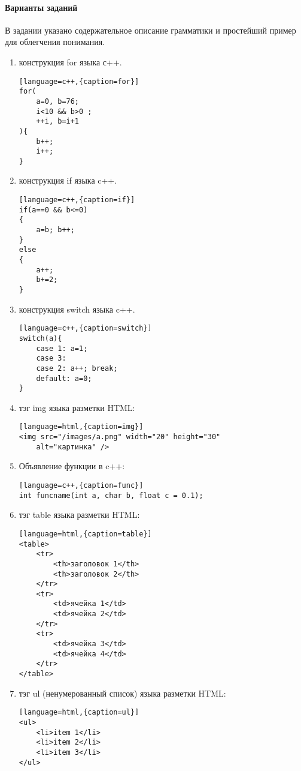 \documentclass[a4paper,12pt]{article}
\begin{document}
\paragraph{Варианты заданий}
В задании указано содержательное описание грамматики и простейший пример для облегчения понимания.
\begin{enumerate}
	\item конструкция for языка с++. 
\begin{lstlisting}[language=c++,{caption=for}]
for(
	a=0, b=76; 
	i<10 && b>0 ;
	++i, b=i+1
){ 
	b++;
	i++;
}
\end{lstlisting}

	\item конструкция if языка c++. 
\begin{lstlisting}[language=c++,{caption=if}]
if(a==0 && b<=0)
{
	a=b; b++;
}
else
{
	a++; 
	b+=2;
}
\end{lstlisting}

	\item конструкция switch языка c++. 
\begin{lstlisting}[language=c++,{caption=switch}]
switch(a){ 
	case 1: a=1; 
	case 3: 
	case 2: a++; break; 
	default: a=0;
}
\end{lstlisting}

	\item тэг img языка разметки HTML: 
\begin{lstlisting}[language=html,{caption=img}]
<img src="/images/a.png" width="20" height="30" 
	alt="картинка" />
\end{lstlisting}

	\item Объявление функции в c++:
\begin{lstlisting}[language=c++,{caption=func}]
int funcname(int a, char b, float c = 0.1);
\end{lstlisting}

	\item тэг table языка разметки HTML: 
\begin{lstlisting}[language=html,{caption=table}]
<table>
	<tr>
		<th>заголовок 1</th>
		<th>заголовок 2</th>
	</tr>
	<tr>
		<td>ячейка 1</td>
		<td>ячейка 2</td>
	</tr>
	<tr>
		<td>ячейка 3</td>
		<td>ячейка 4</td>
	</tr>
</table>
\end{lstlisting}

	\item тэг ul (ненумерованный список) языка разметки HTML: 
\begin{lstlisting}[language=html,{caption=ul}]
<ul>
	<li>item 1</li>
	<li>item 2</li>
	<li>item 3</li>
</ul>
\end{lstlisting}


\end{enumerate}
\end{document}
